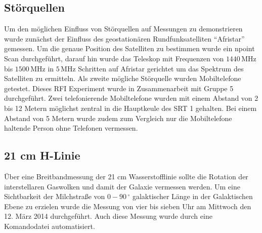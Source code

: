 \subsection{Störquellen}
Um den möglichen Einfluss von Störquellen auf Messungen zu demonstrieren wurde zunächst der Einfluss des geostationären Rundfunksatelliten \enquote{Afristar} gemessen. Um die genaue Position des Satelliten zu bestimmen wurde ein npoint Scan durchgeführt, darauf hin wurde das Teleskop mit Frequenzen von $1440\,\mathrm{MHz}$ bis $1500\,\mathrm{MHz}$ in $5\,\mathrm{MHz}$ Schritten auf Afristar gerichtet um das Spektrum des Satelliten zu ermitteln.
Als zweite mögliche Störquelle wurden Mobiltelefone getestet. Dieses RFI Experiment wurde in Zusammenarbeit mit Gruppe 5 durchgeführt. Zwei telefonierende Mobiltelefone wurden mit einem Abstand von 2 bis 12 Metern möglichst zentral in die Hauptkeule des SRT 1 gehalten. Bei einem Abstand von 5 Metern wurde zudem zum Vergleich nur die Mobiltelefone haltende Person ohne Telefonen vermessen.
\subsection{21 cm H-Linie}
Über eine Breitbandmessung der 21 cm Wasserstofflinie sollte die Rotation der interstellaren Gaswolken und damit der Galaxie vermessen werden. Um eine Sichtbarkeit der Milchstraße von $0-90\,^\circ$ galaktischer Länge in der Galaktischen Ebene zu erzielen wurde die Messung von vier bis sieben Uhr am Mittwoch den 12. März 2014 durchgeführt. Auch diese Messung wurde durch eine Komandodatei automatisiert.


